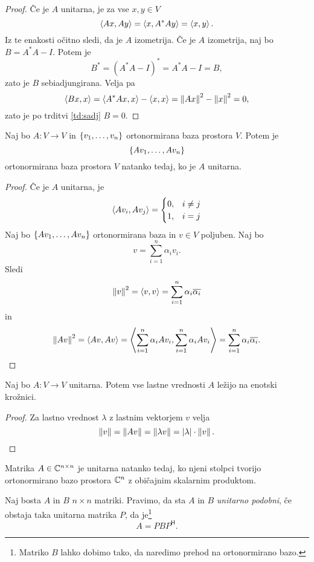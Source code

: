 \documentclass[12pt, a4paper]{article}
\begin{document}
\begin{proof}
Če je $A$ unitarna, je za vse $x,y\in V$
\[
\left\langle Ax,Ay\right\rangle=\left\langle x,A^*Ay\right\rangle=\left\langle x,y\right\rangle.
\]
Iz te enakosti očitno sledi, da je $A$ izometrija. Če je $A$ izometrija, naj bo $B=A^*A-I$. Potem je
\[
B^*=(A^*A-I)^*=A^*A-I=B,
\]
zato je $B$ sebiadjungirana. Velja pa
\[
\left\langle Bx,x\right\rangle=\left\langle A^*Ax,x\right\rangle-\left\langle x,x\right\rangle=\left\lVert Ax\right\rVert^2-\left\lVert x\right\rVert^2=0,
\]
zato je po trditvi \ref{td:sadj} $B=0$.
\end{proof}

\begin{trditev}
Naj bo $A\colon V\to V$ in $\left\{v_1,\dots,v_n\right\}$ ortonormirana baza prostora $V$. Potem je
\[
\left\{Av_1,\dots,Av_n\right\}
\]
ortonormirana baza prostora $V$ natanko tedaj, ko je $A$ unitarna.
\end{trditev}

\begin{proof}
Če je $A$ unitarna, je
\[
\left\langle Av_i,Av_j\right\rangle=\begin{cases}
0, & i\ne j
\\
1, & i = j
\end{cases}
\]
Naj bo $\left\{Av_1,\dots,Av_n\right\}$ ortonormirana baza in $v\in V$ poljuben. Naj bo
\[
v=\sum_{i=1}^n \alpha_iv_i.
\]
Sledi
\[
\left\lVert v\right\rVert^2=\left\langle v,v\right\rangle=\sum_{i=1}^n\alpha_i\overline{\alpha_i}
\]
in
\[
\left\lVert Av\right\rVert^2=\left\langle Av,Av\right\rangle=\left\langle \sum_{i=1}^n \alpha_i Av_i,\sum_{i=1}^n \alpha_i Av_i\right\rangle=\sum_{i=1}^n\alpha_i\overline{\alpha_i}.\qedhere
\]
\end{proof}

\begin{izrek}
Naj bo $A\colon V\to V$ unitarna. Potem vse lastne vrednosti $A$ ležijo na enotski krožnici.
\end{izrek}

\begin{proof}
Za lastno vrednost $\lambda$ z lastnim vektorjem $v$ velja
\[
\left\lVert v\right\rVert=\left\lVert Av\right\rVert=\left\lVert \lambda v\right\rVert=\left\lvert \lambda\right\rvert\cdot\left\lVert v\right\rVert.\qedhere
\]
\end{proof}

\begin{trditev}
Matrika $A\in\mathbb{C}^{n\times n}$ je unitarna natanko tedaj, ko njeni stolpci tvorijo ortonormirano bazo prostora $\mathbb{C}^n$ z običajnim skalarnim produktom.
\end{trditev}

\obvs

\begin{definicija}
Naj bosta $A$ in $B$ $n\times n$ matriki. Pravimo, da sta $A$ in $B$ \emph{unitarno podobni}, če obstaja taka unitarna matrika $P$, da je\footnote{Matriko $B$ lahko dobimo tako, da naredimo prehod na ortonormirano bazo.}
\[
A=PBP^\mathsf{H}.
\]
\end{definicija}
\end{document}
